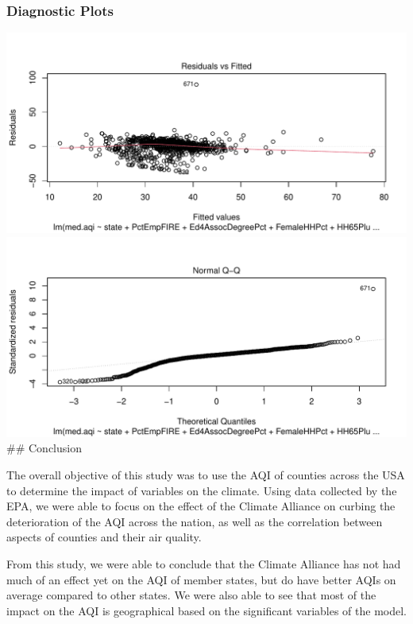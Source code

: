 \documentclass[
  ignorenonframetext,
]{beamer}
\begin{document}
\begin{frame}
\frametitle{Diagnostic Plots}

\includegraphics[width=0.5\linewidth]{final_files/figure-beamer/plots-1}
\includegraphics[width=0.5\linewidth]{final_files/figure-beamer/plots-2}
\#\# Conclusion

The overall objective of this study was to use the AQI of counties
across the USA to determine the impact of variables on the climate.
Using data collected by the EPA, we were able to focus on the effect of
the Climate Alliance on curbing the deterioration of the AQI across the
nation, as well as the correlation between aspects of counties and their
air quality.

From this study, we were able to conclude that the Climate Alliance has
not had much of an effect yet on the AQI of member states, but do have
better AQIs on average compared to other states. We were also able to
see that most of the impact on the AQI is geographical based on the
significant variables of the model.
\end{frame}
\end{document}
